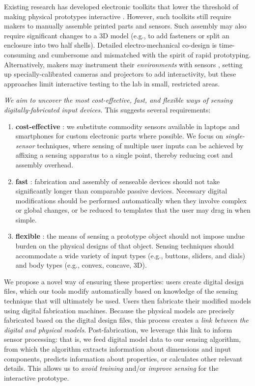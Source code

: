 Existing research has developed electronic toolkits that lower the threshold of making physical prototypes interactive \cite{arduino,greenberg-phidgets}. However, such toolkits still require makers to manually assemble printed parts and sensors. Such assembly may also require significant changes to a 3D model (e.g., to add fasteners or split an enclosure into two half shells). Detailed electro-mechanical co-design is time-consuming and cumbersome and mismatched with the spirit of rapid prototyping. Alternatively, makers may instrument their  \emph{environments} with sensors \cite{akaoka-displayobjects,wilson-depthtouch}, setting up specially-calibrated cameras and projectors to add interactivity, but these approaches limit interactive testing to the lab in small, restricted areas.

\emph{We aim to uncover the most cost-effective, fast, and flexible ways of sensing digitally-fabricated input devices.} This suggests several requirements:
\begin{enumerate}
\item \textbf{cost-effective} : we substitute commodity sensors available in laptops and smartphones for custom electronic parts where possible. We focus on \emph{single-sensor} techniques, where sensing of multiple user inputs can be achieved by affixing a sensing apparatus to a single point, thereby reducing cost and assembly overhead.
\item \textbf{fast} : fabrication and assembly of senseable devices should not take significantly longer than comparable passive devices. Necessary digital modifications should be performed automatically when they involve complex or global changes, or be reduced to templates that the user may drag in when simple.
\item \textbf{flexible} : the means of sensing a prototype object should not impose undue burden on the physical designs of that object. Sensing techniques should accommodate a wide variety of input types (e.g., buttons, sliders, and dials) and body types (e.g., convex, concave, 3D).
\end{enumerate}
We propose a novel way of ensuring these properties: users create digital design files, which our tools modify automatically based on knowledge of the sensing technique that will ultimately be used. Users then fabricate their modified models using digital fabrication machines. Because the physical models are precisely fabricated based on the digital design files, this process creates a \emph{link between the digital and physical models}. Post-fabrication, we leverage this link to inform sensor processing: that is, we feed digital model data to our sensing algorithm, from which the algorithm extracts information about dimensions and input components, predicts information about properties, or calculates other relevant details. This allows us to \emph{avoid training} and/or \emph{improve sensing} for the interactive prototype.

